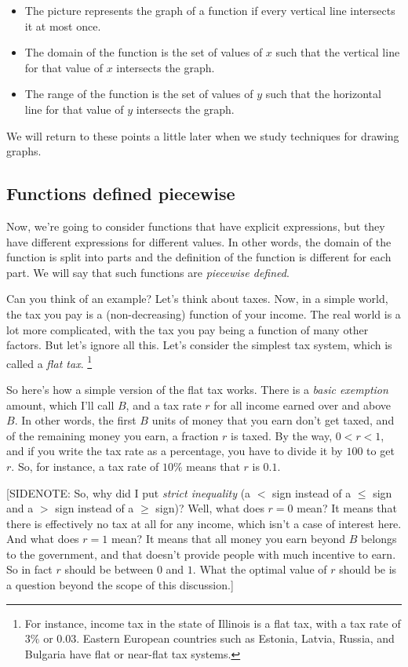 \documentclass{amsart}
\begin{document}
\begin{itemize}
\item The picture represents the graph of a function if every vertical
  line intersects it at most once.
\item The domain of the function is the set of values of $x$ such that
  the vertical line for that value of $x$ intersects the graph.
\item The range of the function is the set of values of $y$ such that
  the horizontal line for that value of $y$ intersects the graph.
\end{itemize}

We will return to these points a little later when we study techniques
for drawing graphs.
\subsection{Functions defined piecewise}

Now, we're going to consider functions that have explicit expressions,
but they have different expressions for different values. In other
words, the domain of the function is split into parts and the
definition of the function is different for each part. We will say
that such functions are {\em piecewise defined}.

Can you think of an example? Let's think about taxes. Now, in a simple
world, the tax you pay is a (non-decreasing) function of your
income. The real world is a lot more complicated, with the tax you pay
being a function of many other factors. But let's ignore all
this. Let's consider the simplest tax system, which is called a {\em
flat tax}. \footnote{For instance, income tax in the state of Illinois
is a flat tax, with a tax rate of $3\%$ or $0.03$. Eastern European
countries such as Estonia, Latvia, Russia, and Bulgaria have flat or
near-flat tax systems.}

So here's how a simple version of the flat tax works. There is a {\em
basic exemption} amount, which I'll call $B$, and a tax rate $r$ for
all income earned over and above $B$. In other words, the first $B$
units of money that you earn don't get taxed, and of the remaining
money you earn, a fraction $r$ is taxed. By the way, $0 < r < 1$, and
if you write the tax rate as a percentage, you have to divide it by
$100$ to get $r$. So, for instance, a tax rate of $10\%$ means
that $r$ is $0.1$.

[SIDENOTE: So, why did I put {\em strict inequality} (a $<$ sign
instead of a $\le$ sign and a $>$ sign instead of a $\ge$ sign)?
Well, what does $r = 0$ mean? It means that there is effectively no
tax at all for any income, which isn't a case of interest here. And
what does $r = 1$ mean? It means that all money you earn beyond $B$
belongs to the government, and that doesn't provide people with much
incentive to earn. So in fact $r$ should be between $0$ and $1$. What
the optimal value of $r$ should be is a question beyond the scope of
this discussion.]
\end{document}
